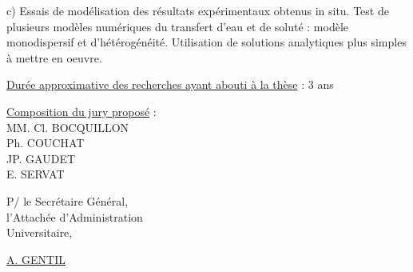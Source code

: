 c) Essais de modélisation des résultats expérimentaux obtenus in situ. Test de plusieurs modèles numériques du transfert d'eau et de soluté : modèle monodispersif et d'hétérogénéité. Utilisation de solutions analytiques plus simples à mettre en oeuvre.

\uline{Durée approximative des recherches ayant abouti à la thèse} : 3 ans

\uline{Composition du jury proposé} :\\
MM. Cl. BOCQUILLON\\
Ph. COUCHAT\\
JP. GAUDET\\
E. SERVAT

P/ le Secrétaire Général,\\
l'Attachée d'Administration\\
Universitaire,

\uline{}

\uline{A. GENTIL}
